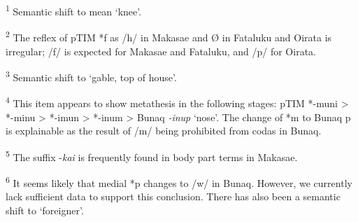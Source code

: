 \textsuperscript{1} Semantic shift to mean `knee'.  

\textsuperscript{2} The reflex of pTIM *f as /h/ in Makasae and {\O} in Fataluku and Oirata is irregular; /f/ is expected for Makasae and Fataluku, and /p/ for Oirata.  

\textsuperscript{3} Semantic shift to `gable, top of house'.  

\textsuperscript{4} This item appears to show metathesis in the following stages: pTIM *-muni {\textgreater} *-minu {\textgreater} *-imun {\textgreater} *-inum {\textgreater} Bunaq \textit{{}-inup} `nose'. The change of *m to Bunaq p is explainable as the result of /m/ being prohibited from codas in Bunaq.  

\textsuperscript{5} The suffix -\textit{kai} is frequently found in body part terms in Makasae. 
 
 \textsuperscript{6} It seems likely that medial *p changes to /w/ in Bunaq. However, we currently lack sufficient data to support this conclusion. There has also been a semantic shift to `foreigner'.


